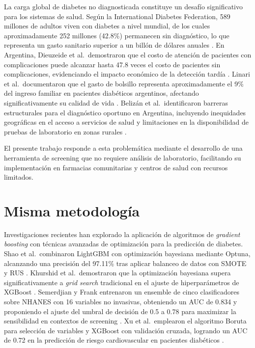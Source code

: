 \documentclass[12pt, a4paper]{report}
\begin{document}
La carga global de diabetes no diagnosticada constituye un desafío significativo para los sistemas de salud. Según la International Diabetes Federation, 589 millones de adultos viven con diabetes a nivel mundial, de los cuales aproximadamente 252 millones (42.8\%) permanecen sin diagnóstico, lo que representa un gasto sanitario superior a un billón de dólares anuales \citep{idf2025atlas}. En Argentina, Dieuzeide et al.\ demostraron que el costo de atención de pacientes con complicaciones puede alcanzar hasta 47.8 veces el costo de pacientes sin complicaciones, evidenciando el impacto económico de la detección tardía \citep{dieuzeide2025impacto}. Linari et al.\ documentaron que el gasto de bolsillo representa aproximadamente el 9\% del ingreso familiar en pacientes diabéticos argentinos, afectando significativamente su calidad de vida \citep{linari2019calidad}. Belizán et al.\ identificaron barreras estructurales para el diagnóstico oportuno en Argentina, incluyendo inequidades geográficas en el acceso a servicios de salud y limitaciones en la disponibilidad de pruebas de laboratorio en zonas rurales \citep{belizan2020barriers}.

El presente trabajo responde a esta problemática mediante el desarrollo de una herramienta de screening que no requiere análisis de laboratorio, facilitando su implementación en farmacias comunitarias y centros de salud con recursos limitados.

\section{Misma metodología}

Investigaciones recientes han explorado la aplicación de algoritmos de \textit{gradient boosting} con técnicas avanzadas de optimización para la predicción de diabetes. Shao et al.\ combinaron LightGBM con optimización bayesiana mediante Optuna, alcanzando una precisión del 97.11\% tras aplicar balanceo de datos con SMOTE y RUS \citep{shao2024optimization}. Khurshid et al.\ demostraron que la optimización bayesiana supera significativamente a \textit{grid search} tradicional en el ajuste de hiperparámetros de XGBoost \citep{khurshid2025unveiling}. Semerdjian y Frank entrenaron un ensemble de cinco clasificadores sobre NHANES con 16 variables no invasivas, obteniendo un AUC de 0.834 y proponiendo el ajuste del umbral de decisión de 0.5 a 0.78 para maximizar la sensibilidad en contextos de screening \citep{semerdjian2017ensemble}. Xu et al.\ emplearon el algoritmo Boruta para selección de variables y XGBoost con validación cruzada, logrando un AUC de 0.72 en la predicción de riesgo cardiovascular en pacientes diabéticos \citep{xu2024development}.
\end{document}
